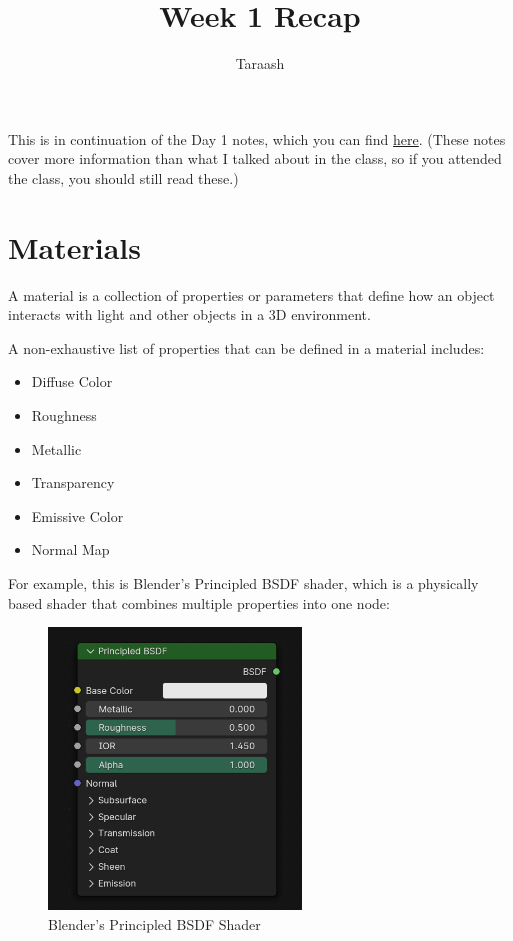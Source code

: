 \documentclass{article}
\title{Week 1 Recap}
\author{Taraash}
\date{}
\begin{document}
\maketitle

\tableofcontents
\newpage

This is in continuation of the Day 1 notes, which you can find \href{https://drive.google.com/file/d/1gTv4I6fxLQCYuvl5RoD4AZJ5WyXFFGp4/view?usp=sharing}{here}. (These notes cover more information than what I talked about in the class, so if you attended the class, you should still read these.)

\section{Materials}
A material is a collection of properties or parameters that define how an object interacts with light and other objects in a 3D environment.

A non-exhaustive list of properties that can be defined in a material includes:
\begin{itemize}
    \item Diffuse Color
    \item Roughness
    \item Metallic
    \item Transparency
    \item Emissive Color
    \item Normal Map
\end{itemize}

For example, this is Blender's Principled BSDF shader, which is a physically based shader that combines multiple properties into one node:

\begin{figure}[h]
    \centering
    \includegraphics[width=0.6\textwidth]{day2images/image.png}
    \caption{Blender's Principled BSDF Shader}
    \label{fig:principled_bsdf}
\end{figure}
\end{document}
